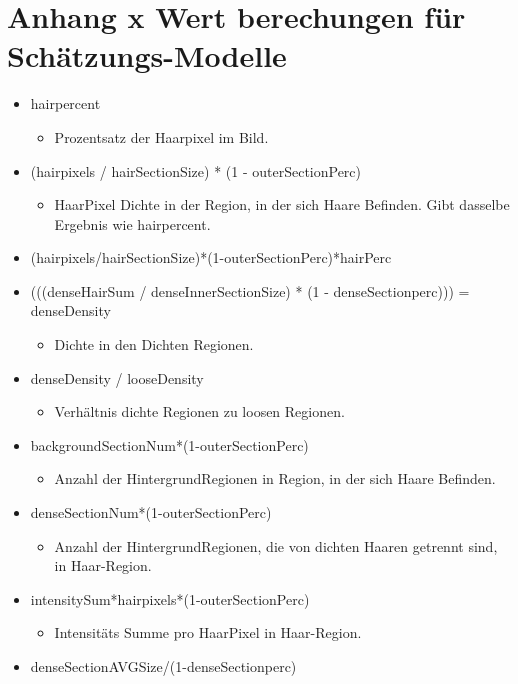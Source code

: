 \documentclass[german,a4paper, 12pt]{llncs}
\begin{document}
\section{Anhang x Wert berechungen für Schätzungs-Modelle}
\label{appendix:xwertemodel}
\begin{itemize}
	\item hairpercent 
	\begin{itemize}
		\item Prozentsatz der Haarpixel im Bild.
	\end{itemize}
	\item (hairpixels / hairSectionSize) * (1 - outerSectionPerc)
	\begin{itemize}
		\item HaarPixel Dichte in der Region, in der sich Haare Befinden. Gibt dasselbe Ergebnis wie hairpercent.
	\end{itemize}
	\item (hairpixels/hairSectionSize)*(1-outerSectionPerc)*hairPerc
	\item (((denseHairSum / denseInnerSectionSize) * (1 - denseSectionperc))) = denseDensity
	\begin{itemize}
		\item Dichte in den Dichten Regionen.
	\end{itemize}
	\item denseDensity / looseDensity
	\begin{itemize}
		\item Verhältnis dichte Regionen zu loosen Regionen.
	\end{itemize}
	\item backgroundSectionNum*(1-outerSectionPerc)
		\begin{itemize}
		\item Anzahl der HintergrundRegionen in Region, in der sich Haare Befinden.
	\end{itemize}
	\item denseSectionNum*(1-outerSectionPerc)
		\begin{itemize}
		\item Anzahl der HintergrundRegionen, die von dichten Haaren getrennt sind, in Haar-Region.
	\end{itemize}
	\item intensitySum*hairpixels*(1-outerSectionPerc)
	\begin{itemize}
		\item Intensitäts Summe pro HaarPixel in Haar-Region.
	\end{itemize}
	\item denseSectionAVGSize/(1-denseSectionperc)

\end{itemize}
\end{document}

